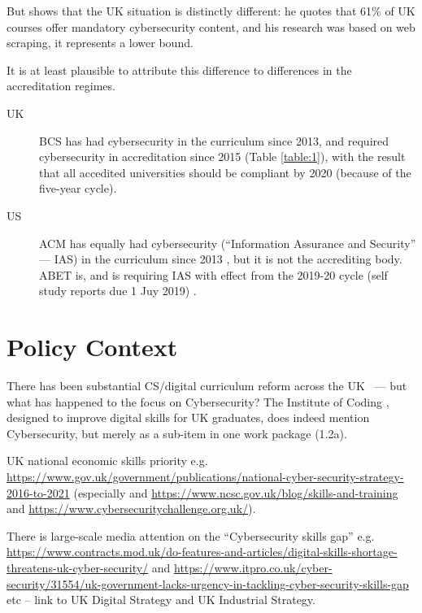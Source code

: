 \documentclass[conference]{IEEEtran}
\begin{document}
But \cite[Table 1]{Ruiz2019a} shows that the UK situation is distinctly different: he quotes that 61\% of UK courses offer mandatory cybersecurity content, and his research was based on web scraping, it represents a lower bound.

It is at least plausible to attribute this difference to differences in the accreditation regimes.
\begin{description}
\item[UK]BCS has had cybersecurity in the curriculum since 2013, and required cybersecurity in accreditation since 2015 (Table \ref{table:1}), with the result that all accedited universities should be compliant by 2020 (because of the five-year cycle).
\item[US]ACM has equally had cybersecurity (``Information Assurance and Security'' --- IAS) in the curriculum since 2013 \cite{ACM2013a}, but it is not the accrediting body. ABET is, and is requiring IAS with effect from the 2019-20 cycle (self study reports due 1 Juy 2019) \cite[chapter 7]{Davenportminor2019a}.  %
\end{description}
\section{Policy Context}



There has been substantial CS/digital curriculum reform across the
UK~\cite{crick+sentance:2011,brown-et-al:sigcse2013,wgictreview:2013,brown-et-al:toce2014,moller+crick:jce2018}
--- but what has happened to the focus on Cybersecurity?  The Institute of Coding \cite{Davenportetal2019a}, designed to improve digital skills for UK graduates, does indeed mention Cybersecurity, but merely as a sub-item in one work package (1.2a).

UK national economic skills priority
e.g. \url{https://www.gov.uk/government/publications/national-cyber-security-strategy-2016-to-2021}
(especially \cite{JCNSS2018a}
and \url{https://www.ncsc.gov.uk/blog/skills-and-training} and
\url{https://www.cybersecuritychallenge.org.uk/}). 

There is large-scale media
attention on the ``Cybersecurity skills gap''
e.g. \url{https://www.contracts.mod.uk/do-features-and-articles/digital-skills-shortage-threatens-uk-cyber-security/}
and
\url{https://www.itpro.co.uk/cyber-security/31554/uk-government-lacks-urgency-in-tackling-cyber-security-skills-gap}
etc -- link to UK Digital Strategy and UK Industrial Strategy.
\end{document}
